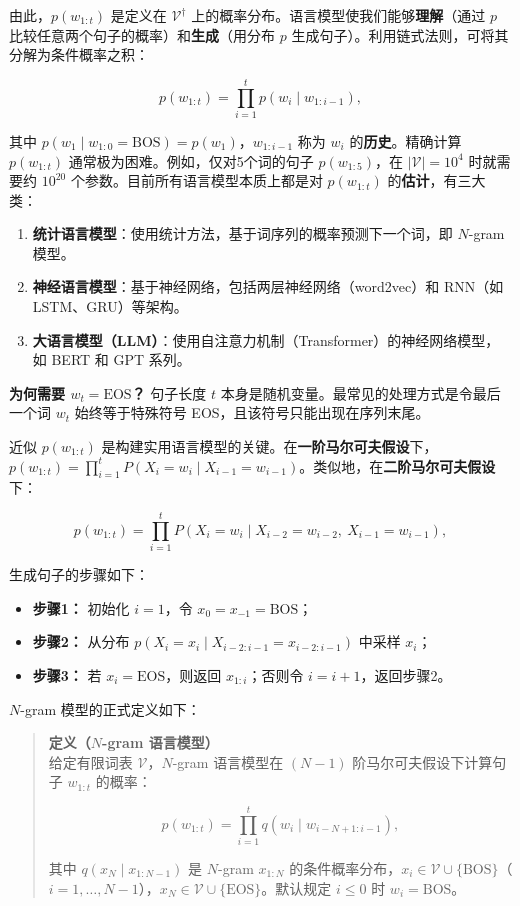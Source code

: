\documentclass[
  11pt,
  a4paper,
]{article}
\providecommand{\tightlist}{%
  \setlength{\itemsep}{0pt}\setlength{\parskip}{0pt}}
\begin{document}
由此，\(p(w_{1:t})\) 是定义在 \(\mathcal{V}^{\dagger}\)
上的概率分布。语言模型使我们能够\textbf{理解}（通过 \(p\)
比较任意两个句子的概率）和\textbf{生成}（用分布 \(p\)
生成句子）。利用链式法则，可将其分解为条件概率之积：

\[p(w_{1:t}) = \prod_{i=1}^t p(w_i \mid w_{1:i-1}),\]

其中 \(p(w_1 \mid w_{1:0} = \text{BOS}) = p(w_1)\)，\(w_{1:i-1}\) 称为
\(w_i\) 的\textbf{历史}。精确计算 \(p(w_{1:t})\)
通常极为困难。例如，仅对5个词的句子 \(p(w_{1:5})\)，在
\(|\mathcal{V}| = 10^4\) 时就需要约 \(10^{20}\)
个参数。目前所有语言模型本质上都是对 \(p(w_{1:t})\)
的\textbf{估计}，有三大类：

\begin{enumerate}
\def\labelenumi{\arabic{enumi}.}
\tightlist
\item
  \textbf{统计语言模型}：使用统计方法，基于词序列的概率预测下一个词，即
  \(N\)-gram 模型。
\item
  \textbf{神经语言模型}：基于神经网络，包括两层神经网络（word2vec）和
  RNN（如 LSTM、GRU）等架构。
\item
  \textbf{大语言模型（LLM）}：使用自注意力机制（Transformer）的神经网络模型，如
  BERT 和 GPT 系列。
\end{enumerate}

\textbf{为何需要 \(w_t = \text{EOS}\)？} 句子长度 \(t\)
本身是随机变量。最常见的处理方式是令最后一个词 \(w_t\) 始终等于特殊符号
EOS，且该符号只能出现在序列末尾。

近似 \(p(w_{1:t})\)
是构建实用语言模型的关键。在\textbf{一阶马尔可夫假设}下，\(p(w_{1:t}) = \prod_{i=1}^t P(X_i = w_i \mid X_{i-1} = w_{i-1})\)。类似地，在\textbf{二阶马尔可夫假设}下：

\[p(w_{1:t}) = \prod_{i=1}^t P(X_i = w_i \mid X_{i-2} = w_{i-2},\ X_{i-1} = w_{i-1}),\]

生成句子的步骤如下：

\begin{itemize}
\tightlist
\item
  \textbf{步骤1：} 初始化 \(i = 1\)，令 \(x_0 = x_{-1} = \text{BOS}\)；
\item
  \textbf{步骤2：} 从分布
  \(p(X_i = x_i \mid X_{i-2:i-1} = x_{i-2:i-1})\) 中采样 \(x_i\)；
\item
  \textbf{步骤3：} 若 \(x_i = \text{EOS}\)，则返回 \(x_{1:i}\)；否则令
  \(i = i + 1\)，返回步骤2。
\end{itemize}

\(N\)-gram 模型的正式定义如下：

\begin{quote}
\textbf{定义（\(N\)-gram 语言模型）}\\
给定有限词表 \(\mathcal{V}\)，\(N\)-gram 语言模型在 \((N-1)\)
阶马尔可夫假设下计算句子 \(w_{1:t}\) 的概率：

\[p(w_{1:t}) = \prod_{i=1}^t q(w_i \mid w_{i-N+1:i-1}),\]

其中 \(q(x_N \mid x_{1:N-1})\) 是 \(N\)-gram \(x_{1:N}\)
的条件概率分布，\(x_i \in \mathcal{V} \cup \{\text{BOS}\}\)（\(i = 1, \ldots, N-1\)），\(x_N \in \mathcal{V} \cup \{\text{EOS}\}\)。默认规定
\(i \leq 0\) 时 \(w_i = \text{BOS}\)。
\end{quote}
\end{document}
